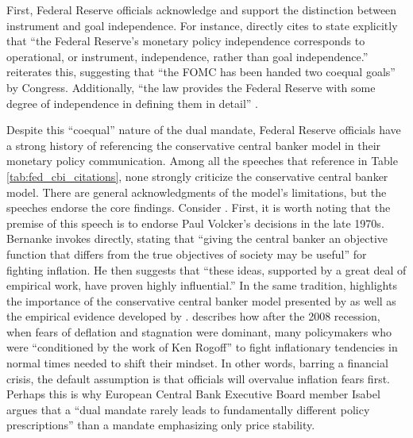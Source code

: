\documentclass[12pt,a4paper]{article}
\begin{document}
\begin{doublespace}
First, Federal Reserve officials acknowledge and support the distinction between instrument and goal independence. For instance, \textcite{powell_panel_2023} directly cites \textcite{debelle_how_1994} to state explicitly that ``the Federal Reserve's monetary policy independence corresponds to operational, or instrument, independence, rather than goal independence.'' \textcite{kugler_central_2024} reiterates this, suggesting that ``the FOMC has been handed two coequal goals'' by Congress. Additionally, ``the law provides the Federal Reserve with some degree of independence in defining them in detail'' \parencite{kugler_central_2024}.

Despite this ``coequal'' nature of the dual mandate, Federal Reserve officials have a strong history of referencing the conservative central banker model in their monetary policy communication. Among all the speeches that reference \textcite{rogoff_optimal_1985} in Table \ref{tab:fed_cbi_citations}, none strongly criticize the conservative central banker model. There are general acknowledgments of the model's limitations, but the speeches endorse the core findings. Consider \textcite{bernanke_what_2004}. First, it is worth noting that the premise of this speech is to endorse Paul Volcker's decisions in the late 1970s. Bernanke invokes \textcite{rogoff_optimal_1985} directly, stating that ``giving the central banker an objective function that differs from the true objectives of society may be useful'' for fighting inflation. He then suggests that ``these ideas, supported by a great deal of empirical work, have proven highly influential.'' In the same tradition, \textcite{powell_panel_2023} highlights the importance of the conservative central banker model presented by \textcite{rogoff_optimal_1985} as well as the empirical evidence developed by \textcite{alesina_central_1993}. \textcite{evans_feds_2011} describes how after the 2008 recession, when fears of deflation and stagnation were dominant, many policymakers who were ``conditioned by the work of Ken Rogoff'' to fight inflationary tendencies in normal times needed to shift their mindset. In other words, barring a financial crisis, the default assumption is that officials will overvalue inflation fears first. Perhaps this is why European Central Bank Executive Board member Isabel \textcite{schnabel_navigating_2026} argues that a ``dual mandate rarely leads to fundamentally different policy prescriptions'' than a mandate emphasizing only price stability.


\end{doublespace}
\end{document}
